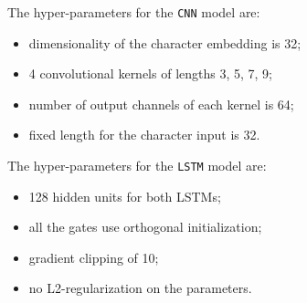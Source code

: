 \documentclass[11pt,a4paper]{article}
\begin{document}
  The hyper-parameters for the \texttt{CNN} model are:
  \begin{itemize}[leftmargin=*]
    \item dimensionality of the character embedding is 32;
    \item 4 convolutional kernels of lengths 3, 5, 7, 9;
    \item number of output channels of each kernel is 64;
    \item fixed length for the character input is 32.
  \end{itemize}

  The hyper-parameters for the \texttt{LSTM} model are:
  \begin{itemize}[leftmargin=*]
    \item 128 hidden units for both LSTMs;
    \item all the gates use orthogonal initialization;
    \item gradient clipping of 10;
    \item no L2-regularization on the parameters.
  \end{itemize}
\end{document}
